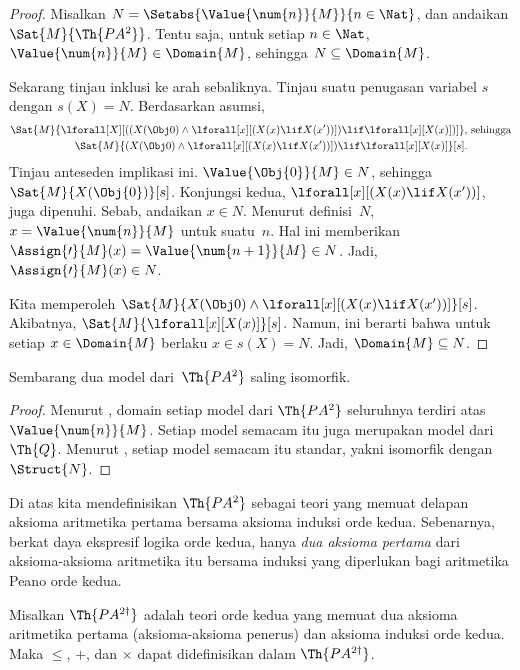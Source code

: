 \documentclass[../../../include/open-logic-section]{subfiles}
\begin{document}
\begin{proof}
Misalkan $N = \Setabs{\Value{\num{n}}{M}}{n \in \Nat}$, dan andaikan
$\Sat{M}{\Th{PA^2}}$. Tentu saja, untuk setiap $n \in \Nat$,
$\Value{\num{n}}{M} \in \Domain{M}$, sehingga $N \subseteq \Domain{M}$.

Sekarang tinjau inklusi ke arah sebaliknya. Tinjau suatu penugasan variabel
$s$ dengan $s(X) = N$. Berdasarkan asumsi,
\begin{align*}
\Sat{M}{\lforall[X][((X(\Obj 0) \land \lforall[x][(X(x)
      \lif X(x'))]) \lif \lforall[x][X(x)])]}, & \text{ sehingga}\\
\Sat{M}{(X(\Obj 0) \land \lforall[x][(X(x) \lif X(x'))]) \lif
  \lforall[x][X(x)]}[s]. & 
\end{align*}
Tinjau anteseden implikasi ini. $\Value{\Obj{0}}{M} \in N$, sehingga
$\Sat{M}{X(\Obj{0})}[s]$. Konjungsi kedua,
$\lforall[x][(X(x) \lif X(x'))]$, juga dipenuhi. Sebab, andaikan $x \in N$.
Menurut definisi~$N$, $x = \Value{\num{n}}{M}$ untuk suatu~$n$. Hal ini
memberikan $\Assign{\prime}{M}(x) = \Value{\num{n+1}}{M} \in N$. Jadi,
$\Assign{\prime}{M}(x) \in N$.

Kita memperoleh $\Sat{M}{X(\Obj 0) \land \lforall[x][(X(x) \lif X(x'))]}[s]$.
Akibatnya, $\Sat{M}{\lforall[x][X(x)]}[s]$. Namun, ini berarti bahwa untuk
setiap $x \in \Domain{M}$ berlaku $x \in s(X) = N$. Jadi, $\Domain{M}
\subseteq N$.
\end{proof}

\begin{cor}
Sembarang dua model dari~$\Th{PA^2}$ saling isomorfik.
\end{cor}

\begin{proof}
Menurut , domain setiap model dari $\Th{PA^2}$
seluruhnya terdiri atas $\Value{\num{n}}{M}$. Setiap model semacam itu juga
merupakan model dari~$\Th{Q}$. Menurut
, setiap model semacam itu standar,
yakni isomorfik dengan~$\Struct{N}$.
\end{proof}

Di atas kita mendefinisikan $\Th{PA^2}$ sebagai teori yang memuat delapan
aksioma aritmetika pertama bersama aksioma induksi orde kedua. Sebenarnya,
berkat daya ekspresif logika orde kedua, hanya \emph{dua aksioma pertama}
dari aksioma-aksioma aritmetika itu bersama induksi yang diperlukan bagi
aritmetika Peano orde kedua.

\begin{prop}
Misalkan $\Th{PA^{2\dagger}}$ adalah teori orde kedua yang memuat dua
aksioma aritmetika pertama (aksioma-aksioma penerus) dan aksioma induksi
orde kedua. Maka $\le$, $+$, dan $\times$ dapat didefinisikan dalam
$\Th{PA^{2\dagger}}$.
\end{prop}
\end{document}
